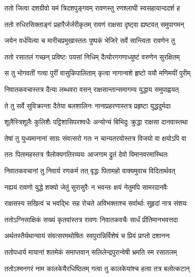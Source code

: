 
\twolineshloka
{ततो जित्वा दशग्रीवो यमं त्रिदशपुङ्गवम्}
{रावणस्तु रणश्लाघी स्वसहायान्ददर्श ह} %

\twolineshloka
{ततो रुधिरसिक्ताङ्गं प्रहारैर्जर्जरीकृतम्}
{रावणं राक्षसा दृष्ट्वा ह्यष्टवत् समुपागमन्} %

\twolineshloka
{जयेन वर्धयित्वा च मारीचप्रमुखास्ततः}
{पुष्पकं भेजिरे सर्वे सान्त्विता रावणेन तु} %

\twolineshloka
{ततो रसातलं गच्छन् प्रविष्टः पयसां निधिम्}
{दैत्योरगगणाध्युष्टं वरुणेन सुरक्षितम्} %

\twolineshloka
{स तु भोगवतीं गत्वा पुरीं वासुकिपालिताम्}
{कृत्वा नागान्वशे हृष्टो ययौ मणिमयीं पुरीम्} %

\twolineshloka
{निवातकवचास्तत्र दैत्या लब्धवरा वसन्}
{राक्षसान्तान्समागम्य युद्धाय समुपाह्वयत्} %

\twolineshloka
{ते तु सर्वे सुविक्रान्ता दैतेया बलशालिनः}
{नानाप्रहरणास्तत्र प्रहृष्टा युद्धदुर्मदाः} %

\twolineshloka
{शूलैस्त्रिशूलैः कुलिशैः पट्टिशासिपरश्वधैः}
{अन्योन्यं बिभिदुः क्रुद्धा राक्षसा दानवास्तथा} %

\twolineshloka
{तेषां तु युध्यमानानां साग्रः संवत्सरो गतः}
{न चान्यतरयोस्तत्र विजयो वा क्षयोऽपि वा} %

\twolineshloka
{ततः पितामहस्तत्र त्रैलोक्यगतिरव्ययः}
{आजगाम द्रुतं देवो विमानवरमास्थितः} %

\twolineshloka
{निवातकवचानां तु निवार्य रणकर्म तत्}
{वृद्धः पितामहो वाक्यमुवाच विदितार्थवत्} %

\twolineshloka
{नह्ययं रावणो युद्धे शक्यो जेतुं सुरासुरैः}
{न भवन्तः क्षयं नेतुमपि सामरदानवैः} %

\twolineshloka
{राक्षसस्य सखित्वं च भवद्भिः सह रोचते}
{अविभक्ताश्च सर्वार्थाः सुहृदां नात्र संशयः} %

\twolineshloka
{ततोऽग्निसाक्षिकं सख्यं कृतवांस्तत्र रावणः}
{निवातकवचैः सार्धं प्रीतिमानभवत्तदा} %

\twolineshloka
{अर्थतस्तैर्यथान्यायं संवत्सरमथोषितः}
{स्वपुरान्निर्विशेषं च प्रियं प्राप्तो दशाननः} %

\twolineshloka
{ततोपधार्य मायानां शतमेकं समाप्तवान्}
{सलिलेन्द्रपुरान्वेषी भ्रमति स्म रसातलम्} %

\twolineshloka
{ततोऽश्मनगरं नाम कालकेयैरधिष्ठितम्}
{गत्वा तु कालकेयांश्च हत्वा तत्र बलोत्कटान्} %

